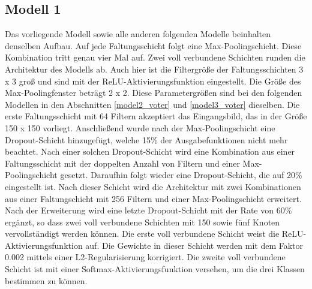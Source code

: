 \subsection{Modell 1}
\label{model1_voter}
Das vorliegende Modell sowie alle anderen folgenden Modelle beinhalten denselben Aufbau. Auf jede Faltungsschicht folgt eine Max-Poolingschicht. Diese Kombination tritt genau vier Mal auf. Zwei voll verbundene Schichten runden die Architektur des Modells ab. Auch hier ist die Filtergröße der Faltungsschichten 3 x 3 groß und sind mit der ReLU-Aktivierungsfunktion eingestellt. Die Größe des Max-Poolingfenster beträgt  2 x 2. Diese Parametergrößen sind bei den folgenden Modellen in den Abschnitten \ref{model2_voter} und \ref{model3_voter} dieselben. 
Die erste Faltungsschicht mit 64 Filtern akzeptiert das Eingangsbild, das in der Größe 150 x 150 vorliegt. Anschließend wurde nach der Max-Poolingschicht eine Dropout-Schicht hinzugefügt, welche 15\% der Ausgabefunktionen nicht mehr beachtet. Nach einer solchen Dropout-Schicht wird eine Kombination aus einer Faltungsschicht mit der doppelten Anzahl von Filtern und einer Max-Poolingschicht gesetzt. Daraufhin folgt wieder eine Dropout-Schicht, die auf 20\% eingestellt ist. Nach dieser Schicht wird die Architektur mit zwei Kombinationen aus einer Faltungschicht mit 256 Filtern und einer Max-Poolingschicht erweitert. Nach der Erweiterung wird eine letzte Dropout-Schicht mit der Rate von 60\% ergänzt, so dass zwei voll verbundene Schichten mit 150 sowie fünf Knoten vervollständigt werden können. Die erste voll verbundene Schicht weist die ReLU-Aktivierungsfunktion auf. Die Gewichte in dieser Schicht werden mit dem Faktor 0.002 mittels einer L2-Regularisierung korrigiert. Die zweite voll verbundene Schicht ist mit einer Softmax-Aktivierungsfunktion versehen, um die drei Klassen bestimmen zu können.        


